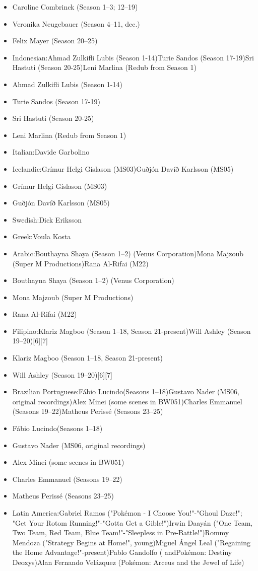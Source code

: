\documentclass[a4paper,12pt]{article}
\begin{document}
\begin{itemize}
\item Caroline Combrinck (Season 1–3; 12–19)
\item Veronika Neugebauer (Season 4–11, dec.)
\item Felix Mayer (Season 20–25)
\item Indonesian:Ahmad Zulkifli Lubis (Season 1-14)Turie Sandos (Season 17-19)Sri Hastuti (Season 20-25)Leni Marlina (Redub from Season 1)
\item Ahmad Zulkifli Lubis (Season 1-14)
\item Turie Sandos (Season 17-19)
\item Sri Hastuti (Season 20-25)
\item Leni Marlina (Redub from Season 1)
\item Italian:Davide Garbolino
\item Icelandic:Grímur Helgi Gíslason (MS03)Guðjón Davíð Karlsson (MS05)
\item Grímur Helgi Gíslason (MS03)
\item Guðjón Davíð Karlsson (MS05)
\item Swedish:Dick Eriksson
\item Greek:Voula Kosta
\item Arabic:Bouthayna Shaya (Season 1–2) (Venus Corporation)Mona Majzoub (Super M Productions)Rana Al-Rifai (M22)
\item Bouthayna Shaya (Season 1–2) (Venus Corporation)
\item Mona Majzoub (Super M Productions)
\item Rana Al-Rifai (M22)
\item Filipino:Klariz Magboo (Season 1–18, Season 21-present)Will Ashley (Season 19–20)[6][7]
\item Klariz Magboo (Season 1–18, Season 21-present)
\item Will Ashley (Season 19–20)[6][7]
\item Brazilian Portuguese:Fábio Lucindo(Seasons 1–18)Gustavo Nader (MS06, original recordings)Alex Minei (some scenes in BW051)Charles Emmanuel (Seasons 19–22)Matheus Perissé (Seasons 23–25)
\item Fábio Lucindo(Seasons 1–18)
\item Gustavo Nader (MS06, original recordings)
\item Alex Minei (some scenes in BW051)
\item Charles Emmanuel (Seasons 19–22)
\item Matheus Perissé (Seasons 23–25)
\item Latin America:Gabriel Ramos ("Pokémon - I Choose You!"-"Ghoul Daze!"; "Get Your Rotom Running!"-"Gotta Get a Gible!")Irwin Daayán ("One Team, Two Team, Red Team, Blue Team!"-"Sleepless in Pre-Battle!")Rommy Mendoza ("Strategy Begins at Home!", young)Miguel Ángel Leal ("Regaining the Home Advantage!"-present)Pablo Gandolfo ( andPokémon: Destiny Deoxys)Alan Fernando Velázquez (Pokémon: Arceus and the Jewel of Life)

\end{itemize}
\end{document}
